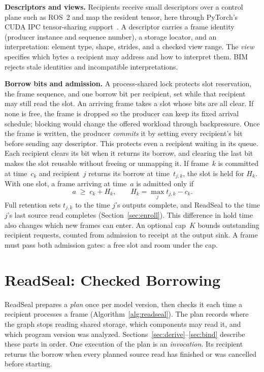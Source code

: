 \documentclass[conference]{IEEEtran}
\begin{document}
\textbf{Descriptors and views.} Recipients receive small descriptors over a control plane such as ROS~2 and map the resident tensor, here through PyTorch's CUDA IPC tensor-sharing support~\cite{torchmp}. A descriptor carries a frame identity (producer instance and sequence number), a storage locator, and an interpretation: element type, shape, strides, and a checked view range. The \emph{view} specifies which bytes a recipient may address and how to interpret them. BIM rejects stale identities and incompatible interpretations.

\textbf{Borrow bits and admission.} A process-shared lock protects slot reservation, the frame sequence, and one borrow bit per recipient, set while that recipient may still read the slot. An arriving frame takes a slot whose bits are all clear. If none is free, the frame is dropped so the producer can keep its fixed arrival schedule; blocking would change the offered workload through backpressure. Once the frame is written, the producer \emph{commits} it by setting every recipient's bit before sending any descriptor. This protects even a recipient waiting in its queue. Each recipient clears its bit when it returns its borrow, and clearing the last bit makes the slot reusable without freeing or unmapping it. If frame~$k$ is committed at time~$c_k$ and recipient~$j$ returns its borrow at time~$t_{j,k}$, the slot is held for $H_k$. With one slot, a frame arriving at time~$a$ is admitted only if
\begin{equation}
a\;\ge\; c_k+H_k, \qquad H_k=\max_j t_{j,k}-c_k. \label{eq:hold}
\end{equation}
Full retention sets $t_{j,k}$ to the time $j$'s outputs complete, and ReadSeal to the time $j$'s last source read completes (Section~\ref{sec:enroll}). This difference in hold time also changes which new frames can enter. An optional cap~$K$ bounds outstanding recipient requests, counted from admission to receipt at the output sink. A frame must pass both admission gates: a free slot and room under the cap.

\section{ReadSeal: Checked Borrowing}
\label{sec:readseal}

ReadSeal prepares a \emph{plan} once per model version, then checks it each time a recipient processes a frame (Algorithm~\ref{alg:readseal}). The plan records where the graph stops reading shared storage, which components may read it, and which program version was analyzed. Sections~\ref{sec:derive}--\ref{sec:bind} describe these parts in order. One execution of the plan is an \emph{invocation}. Its recipient returns the borrow when every planned source read has finished or was cancelled before starting.
\end{document}
